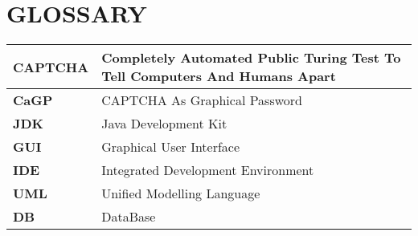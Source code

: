 \chapter{GLOSSARY}
\begin{table}[ht]
\centering
\begin{tabular}{ |M{3cm}|p{8cm}|  }
 \hline
\textbf{CAPTCHA}& Completely Automated Public Turing Test To Tell Computers And  Humans Apart\\
\hline
\textbf{CaGP} &CAPTCHA As Graphical Password\\
\hline
\textbf{JDK} & Java Development Kit\\
\hline
\textbf{GUI} & Graphical User Interface\\
\hline
\textbf{IDE} & Integrated Development Environment \\
\hline
\textbf{UML} & Unified Modelling Language\\
\hline
\textbf{DB}&  DataBase\\
\hline


\end{tabular}

\end{table}

